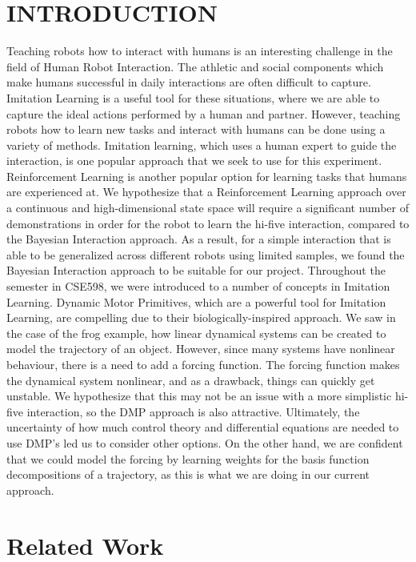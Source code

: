 \documentclass[letterpaper, 10 pt, conference]{ieeeconf}  %
\begin{document}
\section{INTRODUCTION}
Teaching robots how to interact with humans is an interesting challenge in the field of Human Robot Interaction. The athletic and social components which make humans successful in daily interactions are often difficult to capture. Imitation Learning is a useful tool for these situations, where we are able to capture the ideal actions performed by a human and partner. However, teaching robots how to learn new tasks and interact with humans can be done using a variety of methods. Imitation learning, which uses a human expert to guide the interaction, is one popular approach that we seek to use for this experiment. Reinforcement Learning is another popular option for learning tasks that humans are experienced at. We hypothesize that a Reinforcement Learning approach over a continuous and high-dimensional state space will require a significant number of demonstrations in order for the robot to learn the hi-five interaction, compared to the Bayesian Interaction approach. As a result, for a simple interaction that is able to be generalized across different robots using limited samples, we found the Bayesian Interaction approach to be suitable for our project.
\newline
\indent
Throughout the semester in CSE598, we were introduced to a number of concepts in Imitation Learning. Dynamic Motor Primitives, which are a powerful tool for Imitation Learning, are compelling due to their biologically-inspired approach. We saw in the case of the frog example, how linear dynamical systems can be created to model the trajectory of an object. However, since many systems have nonlinear behaviour, there is a need to add a forcing function. The forcing function makes the dynamical system nonlinear, and as a drawback, things can quickly get unstable. We hypothesize that this may not be an issue with a more simplistic hi-five interaction, so the DMP approach is also attractive. Ultimately, the uncertainty of how much control theory and differential equations are needed to use DMP's led us to consider other options. On the other hand, we are confident that we could model the forcing by learning weights for the basis function decompositions of a trajectory, as this is what we are doing in our current approach.
\section{Related Work}
\end{document}
